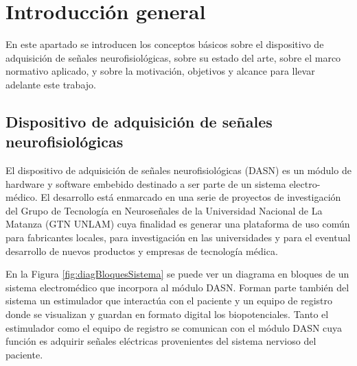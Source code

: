 
\chapter{Introducción general} %

\label{Chapter1} %
\label{IntroGeneral}


\newcommand{\keyword}[1]{\textbf{#1}}
\newcommand{\tabhead}[1]{\textbf{#1}}
\newcommand{\code}[1]{\texttt{#1}}
\newcommand{\file}[1]{\texttt{\bfseries#1}}
\newcommand{\option}[1]{\texttt{\itshape#1}}
\newcommand{\grados}{$^{\circ}$}




En este apartado se introducen los conceptos básicos sobre el dispositivo de adquisición de señales neurofisiológicas, sobre su estado del arte, sobre el marco normativo aplicado, y sobre la motivación, objetivos y alcance para llevar adelante este trabajo.

\section{Dispositivo de adquisición de señales neurofisiológicas}

El dispositivo de adquisición de señales neurofisiológicas (DASN) es un módulo de hardware y software embebido destinado a ser parte de un sistema electro-médico.
El desarrollo está enmarcado en una serie de proyectos de investigación del Grupo de Tecnología en Neuroseñales de la Universidad Nacional de La Matanza (GTN UNLAM) cuya finalidad es generar una plataforma de uso común para fabricantes locales, para investigación en las universidades y para el eventual desarrollo de nuevos productos y empresas de tecnología médica. 

En la Figura \ref{fig:diagBloquesSistema} se puede ver un diagrama en bloques de un sistema electromédico que incorpora al módulo DASN. Forman parte también del sistema un estimulador que interactúa con el paciente y un equipo de registro donde se visualizan y guardan en formato digital los biopotenciales. Tanto el estimulador como el equipo de registro se comunican con el módulo DASN cuya función es adquirir señales eléctricas provenientes del sistema nervioso del paciente.

